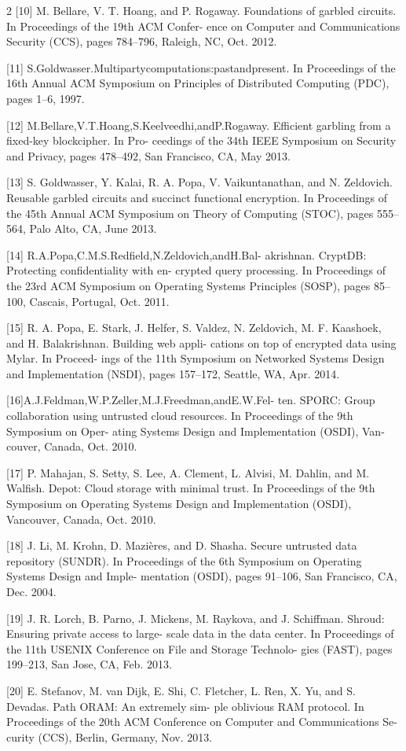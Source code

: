 \documentclass[12pt,a4paper]{article}
\begin{document}
\begin{multicols}{2}
[10] M. Bellare, V. T. Hoang, and P. Rogaway. Foundations of garbled circuits. In Proceedings of the 19th ACM Confer- ence on Computer and Communications Security (CCS), pages 784–796, Raleigh, NC, Oct. 2012.

[11] S.Goldwasser.Multipartycomputations:pastandpresent. In Proceedings of the 16th Annual ACM Symposium on Principles of Distributed Computing (PDC), pages 1–6, 1997.

[12] M.Bellare,V.T.Hoang,S.Keelveedhi,andP.Rogaway. Efficient garbling from a fixed-key blockcipher. In Pro- ceedings of the 34th IEEE Symposium on Security and Privacy, pages 478–492, San Francisco, CA, May 2013.

[13] S. Goldwasser, Y. Kalai, R. A. Popa, V. Vaikuntanathan, and N. Zeldovich. Reusable garbled circuits and succinct functional encryption. In Proceedings of the 45th Annual ACM Symposium on Theory of Computing (STOC), pages 555–564, Palo Alto, CA, June 2013.

[14] R.A.Popa,C.M.S.Redfield,N.Zeldovich,andH.Bal- akrishnan. CryptDB: Protecting confidentiality with en- crypted query processing. In Proceedings of the 23rd ACM Symposium on Operating Systems Principles (SOSP), pages 85–100, Cascais, Portugal, Oct. 2011.

[15] R. A. Popa, E. Stark, J. Helfer, S. Valdez, N. Zeldovich, M. F. Kaashoek, and H. Balakrishnan. Building web appli- cations on top of encrypted data using Mylar. In Proceed- ings of the 11th Symposium on Networked Systems Design and Implementation (NSDI), pages 157–172, Seattle, WA, Apr. 2014.

[16]A.J.Feldman,W.P.Zeller,M.J.Freedman,andE.W.Fel- ten. SPORC: Group collaboration using untrusted cloud resources. In Proceedings of the 9th Symposium on Oper- ating Systems Design and Implementation (OSDI), Van- couver, Canada, Oct. 2010.

[17] P. Mahajan, S. Setty, S. Lee, A. Clement, L. Alvisi, M. Dahlin, and M. Walfish. Depot: Cloud storage with minimal trust. In Proceedings of the 9th Symposium on Operating Systems Design and Implementation (OSDI), Vancouver, Canada, Oct. 2010.

[18] J. Li, M. Krohn, D. Mazières, and D. Shasha. Secure untrusted data repository (SUNDR). In Proceedings of the 6th Symposium on Operating Systems Design and Imple- mentation (OSDI), pages 91–106, San Francisco, CA, Dec. 2004.

[19] J. R. Lorch, B. Parno, J. Mickens, M. Raykova, and J. Schiffman. Shroud: Ensuring private access to large- scale data in the data center. In Proceedings of the 11th USENIX Conference on File and Storage Technolo- gies (FAST), pages 199–213, San Jose, CA, Feb. 2013.

[20] E. Stefanov, M. van Dijk, E. Shi, C. Fletcher, L. Ren, X. Yu, and S. Devadas. Path ORAM: An extremely sim- ple oblivious RAM protocol. In Proceedings of the 20th ACM Conference on Computer and Communications Se- curity (CCS), Berlin, Germany, Nov. 2013.
\end{multicols}
\end{document}
